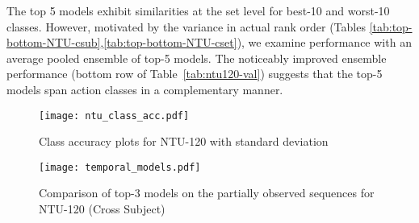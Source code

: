 \documentclass[twocolumn]{svjour3}          \smartqed  \usepackage{graphicx}
\begin{document}
The top 5 models  exhibit similarities at the set level for best-10 and worst-10 classes. However, motivated by the variance in actual rank order (Tables \ref{tab:top-bottom-NTU-csub},\ref{tab:top-bottom-NTU-cset}), we examine performance with an average pooled ensemble of top-5 models. The noticeably improved ensemble performance  (bottom row of Table~\ref{tab:ntu120-val}) suggests that the top-5 models span action classes in a complementary manner.

\begin{figure}[!t]
\centering
    \texttt{[image: ntu\_class\_acc.pdf]}
\caption{Class accuracy plots for NTU-120 with standard deviation}
\label{fig:ntu120-class}
\end{figure}

\begin{figure}[!t]
\centering
    \texttt{[image: temporal\_models.pdf]}
\caption{Comparison of top-3 models on the partially observed sequences for NTU-120 (Cross Subject)}
\label{fig:ntu120-temporal}
\end{figure}
\end{document}
